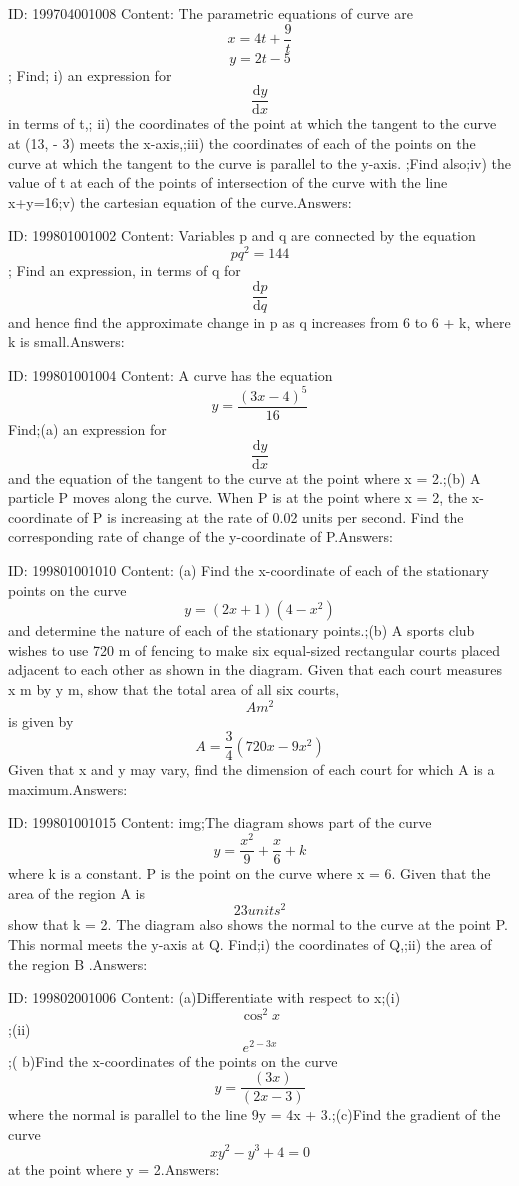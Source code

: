 \documentclass{article}
\begin{document}
ID: 199704001008
Content:
The parametric equations of curve are \[x=4t+\frac{9}{t}\]  \[y=2t-5\] ; Find; i) an expression for \[\frac{\mathrm{d} y}{\mathrm{d} x}\] in terms of t,; ii) the coordinates of the point at which the tangent to the curve at (13, - 3) meets the x-axis,;iii) the coordinates of each of the points on the curve  at which the tangent to the curve is parallel to the y-axis. ;Find also;iv) the value of t at each of the points of intersection of the curve with the line x+y=16;v) the cartesian equation of the curve.Answers:

ID: 199801001002
Content:
Variables p and q are connected by the equation \[pq^2=144\]; Find an expression, in terms of q for \[\frac{\mathrm{d} p}{\mathrm{d} q}\] and hence find the approximate change in p as q increases from 6 to 6 + k, where k is small.Answers:

ID: 199801001004
Content:
A curve has the equation \[y=\frac{(3x-4)^5}{16}\]  Find;(a) an expression for  \[\frac{\mathrm{d} y}{\mathrm{d} x}\] and the equation of the tangent to the curve at the point where x = 2.;(b) A particle P moves along the curve. When P is at the point where x = 2, the x-coordinate of P is increasing at the rate of 0.02 units per second. Find the corresponding rate of change of the y-coordinate of P.Answers:

ID: 199801001010
Content:
(a) Find the x-coordinate of each of the stationary points on the curve \[y=(2x+1)(4-x^2)\] and determine the nature of each of the stationary points.;(b) A sports club wishes to use 720 m of fencing to make six equal-sized rectangular courts placed adjacent to each other as shown in the diagram. Given that each court measures x m by y m, show that the total area of all six courts, \[A m^2\] is given by \[A=\frac{3}{4}(720x-9x^2)\] Given that x and y may vary, find the dimension of each court for which A is a maximum.Answers:

ID: 199801001015
Content:
img;The diagram shows part of the curve \[y=\frac{x^{2}}{9}+\frac{x}{6}+k\] where k is a constant. P is the point on the curve where x = 6. Given that the area of the region A is \[23 units^2\] show that k = 2. The diagram also shows the normal to the curve at the point P. This normal meets the y-axis at Q. Find;i)	the coordinates of Q,;ii)	the area of the region B .Answers:

ID: 199802001006
Content:
(a)Differentiate with respect to x;(i) \[\cos^2x\];(ii) \[e^{2-3x}\];( b)Find the x-coordinates of the points on the curve \[y=\frac{(3x)}{(2x-3)}\] where the normal is parallel to the line 9y = 4x + 3.;(c)Find the gradient of the curve \[xy^2-y^3+4=0\] at the point where y = 2.Answers:
\end{document}
